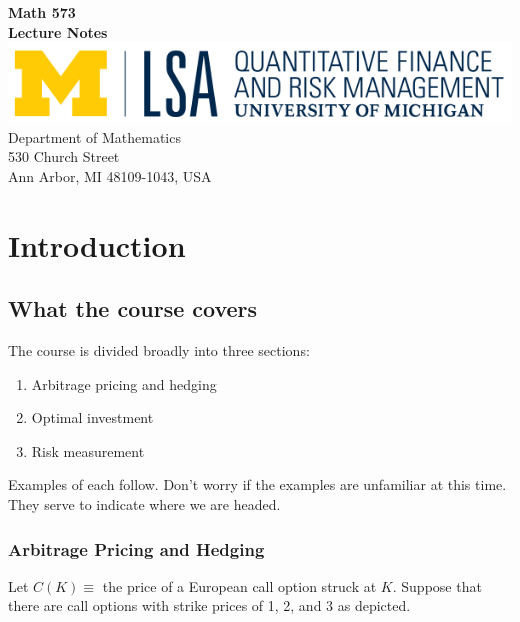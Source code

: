 \documentclass{report}
\numberwithin{problem}{chapter} %
\begin{document}
\begin{titlepage}
\begin{center}
 {\huge\bfseries Math 573\\ Lecture Notes\\}
 \vspace{1.5cm}
 \vspace{10cm}
\includegraphics{QFRM_rgb}\\[5pt]
{Department of Mathematics}\\[5pt]
{530 Church Street}\\[5pt]
{Ann Arbor, MI 48109-1043,
 USA}\\
 \vfill

\end{center}
\end{titlepage}

\chapter{Introduction}

\section{What the course covers}
The course is divided broadly into three sections:
\begin{enumerate}  
\item Arbitrage pricing and hedging 
\item Optimal investment
\item Risk measurement
\end{enumerate}
Examples of each follow. Don't worry if the examples are unfamiliar at this time. They serve to indicate where we are headed. 

\subsection{Arbitrage Pricing and Hedging}
Let $C(K) \equiv$ the price of a European call option struck at $K$. Suppose that there are call options with strike prices of 1, 2, and 3 as depicted. 
\end{document}
